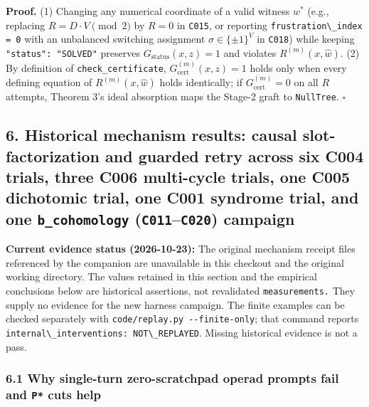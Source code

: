 \documentclass[
  11pt,
]{article}
\newcommand{\passthrough}[1]{#1}
\begin{document}
\textbf{Proof.} (1) Changing any numerical coordinate of a valid witness
\(w^*\) (e.g., replacing \(R = D \cdot V \pmod 2\) by \(R = 0\) in
\passthrough{\lstinline!C015!}, or reporting
\passthrough{\lstinline!frustration\_index = 0!} with an unbalanced
switching assignment \(\sigma \in \{\pm 1\}^V\) in
\passthrough{\lstinline!C018!}) while keeping
\passthrough{\lstinline!"status": "SOLVED"!} preserves
\(G_{\text{status}}(x,\allowbreak  z) = 1\) and violates
\(R^{(m)}(x,\allowbreak  \hat{w})\). (2) By definition of
\nolinkurl{check_certificate},
\(G_{\text{cert}}^{(m)}(x,\allowbreak  z) = 1\) holds only when every
defining equation of \(R^{(m)}(x,\allowbreak  \hat{w})\) holds
identically; if \(G_{\text{cert}}^{(m)} = 0\) on all \(R\) attempts,
Theorem 3's ideal absorption maps the Stage-2 graft to
\passthrough{\lstinline!NullTree!}. \(\square\)

\subsection{\texorpdfstring{6. Historical mechanism results: causal
slot-factorization and guarded retry across six C004 trials, three C006
multi-cycle trials, one C005 dichotomic trial, one C001 syndrome trial,
and one \texttt{b\_cohomology} (\texttt{C011}--\texttt{C020})
campaign}{6. Historical mechanism results: causal slot-factorization and guarded retry across six C004 trials, three C006 multi-cycle trials, one C005 dichotomic trial, one C001 syndrome trial, and one b\_cohomology (C011--C020) campaign}}\label{historical-mechanism-results-causal-slot-factorization-and-guarded-retry-across-six-c004-trials-three-c006-multi-cycle-trials-one-c005-dichotomic-trial-one-c001-syndrome-trial-and-one-b_cohomology-c011c020-campaign}

\textbf{Current evidence status (2026-10-23):} The original mechanism
receipt files referenced by the companion are unavailable in this
checkout and the original working directory. The values retained in this
section and the empirical conclusions below are historical assertions,
not revalidated \nolinkurl{measurements.} They supply no evidence for
the new harness campaign. The finite examples can be checked separately
with \passthrough{\lstinline!code/replay.py --finite-only!}; that
command reports
\passthrough{\lstinline!internal\_interventions: NOT\_REPLAYED!}.
Missing historical evidence is not a pass.

\subsubsection{\texorpdfstring{6.1 Why single-turn zero-scratchpad
operad prompts fail and \texttt{P*} cuts
help}{6.1 Why single-turn zero-scratchpad operad prompts fail and P* cuts help}}\label{why-single-turn-zero-scratchpad-operad-prompts-fail-and-p-cuts-help}
\end{document}
